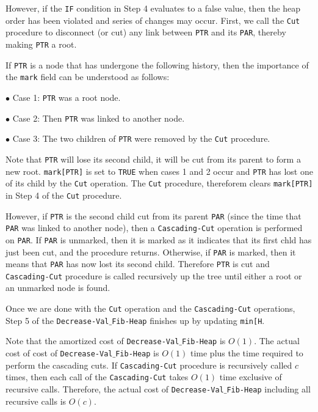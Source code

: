 \vskip 1mm
However, if the {\tt IF} condition in Step 4 evaluates to a false value, then the heap order has been violated and series of changes may occur. First, we call the {\tt Cut} procedure to disconnect (or cut) any link between {\tt PTR} and its {\tt PAR}, thereby making {\tt PTR} a root.

\vskip 1mm
If {\tt PTR} is a node that has undergone the following history, then the importance of the {\tt mark} field can be understood as follows:

\vskip 2mm
\qquad$\bullet$ Case 1: {\tt PTR} was a root node.

\vskip 3mm
\qquad$\bullet$ Case 2: Then {\tt PTR} was linked to another node.

\vskip 3mm
\qquad$\bullet$ Case 3: The two children of {\tt PTR} were removed by the {\tt Cut} procedure.

\vskip 1mm
Note that {\tt PTR} will lose its second child, it will be cut from its parent to form a new root. {\tt mark[PTR]} is set to {\tt TRUE} when cases 1 and 2 occur and {\tt PTR} has lost one of its child by the {\tt Cut} operation. The {\tt Cut} procedure, thereforem clears {\tt mark[PTR]} in Step 4 of the {\tt Cut} procedure.

\vskip 1mm
However, if {\tt PTR} is the second child cut from its parent {\tt PAR} (since the time that {\tt PAR} was linked to another node), then a {\tt Cascading-Cut} operation is performed on {\tt PAR}. If {\tt PAR} is unmarked, then it is marked as it indicates that its first chld has just been cut, and the procedure returns. Otherwise, if {\tt PAR} is marked, then it means that {\tt PAR} has now lost its second child. Therefore {\tt PTR} is cut and {\tt Cascading-Cut} procedure  is called recursively up the tree until either a root or an unmarked node is found.

\vskip 1mm
Once we are done with the {\tt Cut} operation and the {\tt Cascading-Cut} operations, Step 5 of the {\tt Decrease-Val$\_$Fib-Heap} finishes up by updating {\tt min[H}.

\vskip 1mm
Note that the amortized cost of {\tt Decrease-Val$\_$Fib-Heap} is $O(1)$. The actual cost of cost of {\tt Decrease-Val$\_$Fib-Heap} is $O(1)$ time plus the time required to perform the cascading cuts. If {\tt Cascading-Cut} procedure is recursively called $c$ times, then each call of the {\tt Cascading-Cut} takes $O(1)$ time exclusive of recursive calls. Therefore, the actual cost of {\tt Decrease-Val$\_$Fib-Heap} including all recursive calls is $O(c)$.

